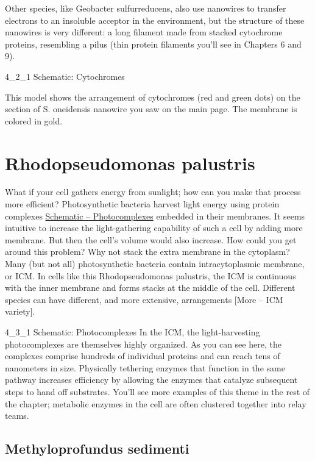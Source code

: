 \documentclass[]{tufte-book}
\begin{document}
Other species, like Geobacter sulfurreducens, also use nanowires to
transfer electrons to an insoluble acceptor in the environment, but the
structure of these nanowires is very different: a long filament made
from stacked cytochrome proteins, resembling a pilus (thin protein
filaments you'll see in Chapters 6 and 9).

4\_2\_1 Schematic: Cytochromes

This model shows the arrangement of cytochromes (red and green dots) on
the section of S. oneidensis nanowire you saw on the main page. The
membrane is colored in gold.

\section{Rhodopseudomonas palustris}\label{rhodopseudomonas-palustris}

What if your cell gathers energy from sunlight; how can you make that
process more efficient? Photosynthetic bacteria harvest light energy
using protein complexes \protect\hyperlink{Photocomplexes}{Schematic --
Photocomplexes} embedded in their membranes. It seems intuitive to
increase the light-gathering capability of such a cell by adding more
membrane. But then the cell's volume would also increase. How could you
get around this problem? Why not stack the extra membrane in the
cytoplasm? Many (but not all) photosynthetic bacteria contain
intracytoplasmic membrane, or ICM. In cells like this Rhodopseudomonas
palustris, the ICM is continuous with the inner membrane and forms
stacks at the middle of the cell. Different species can have different,
and more extensive, arrangements {[}More -- ICM variety{]}.

4\_3\_1 Schematic: Photocomplexes In the ICM, the light-harvesting
photocomplexes are themselves highly organized. As you can see here, the
complexes comprise hundreds of individual proteins and can reach tens of
nanometers in size. Physically tethering enzymes that function in the
same pathway increases efficiency by allowing the enzymes that catalyze
subsequent steps to hand off substrates. You'll see more examples of
this theme in the rest of the chapter; metabolic enzymes in the cell are
often clustered together into relay teams.

\subsection{Methyloprofundus sedimenti}\label{ICM_variety}
\end{document}
